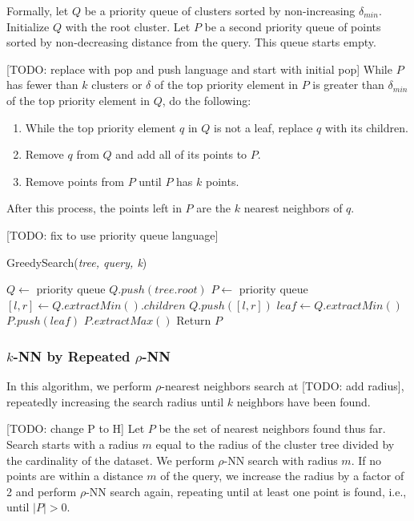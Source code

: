 Formally, let $Q$ be a priority queue of clusters sorted by non-increasing $\delta_{min}$. Initialize $Q$ with the root cluster.
Let $P$ be a second priority queue of points sorted by non-decreasing distance from the query. This queue starts empty.

[TODO: replace with pop and push language and start with initial pop]
While $P$ has fewer than $k$ clusters or $\delta$ of the top priority element in $P$ is greater 
than $\delta_{min}$ of the top priority element in $Q$, do the following:
\begin{enumerate}
\item While the top priority element $q$ in $Q$ is not a leaf, replace $q$ with its children.
\item Remove $q$ from $Q$ and add all of its points to $P$. 
\item Remove points from $P$ until $P$ has $k$ points. 
\end{enumerate}
After this process, the points left in $P$ are the $k$ nearest neighbors of $q$.

[TODO: fix to use priority queue language]

\begin{algorithm} 
\caption{GreedySearch(\emph{tree, query, k})} 
\label{alg:greedy_search} 
\begin{algorithmic}[3]
    \STATE $Q \leftarrow$ priority queue
    \STATE $Q.push(tree.root)$
    \STATE $P \leftarrow$ priority queue
            \STATE $[l, r] \leftarrow Q.extractMin().children$
            \STATE $Q.push([l, r])$
        \ENDWHILE
        \STATE $leaf \leftarrow Q.extractMin()$
        \STATE $P.push(leaf)$
            \STATE $P.extractMax()$
        \ENDWHILE
    \ENDWHILE
    \STATE Return $P$
\end{algorithmic}
\end{algorithm}


\subsubsection{$k$-NN by Repeated $\rho$-NN}
\label{subsubsec:methods:knn-search:repeated-rnn}
In this algorithm, we perform
$\rho$-nearest neighbors search at [TODO: add radius], repeatedly increasing the search radius until $k$ neighbors
have been found.

[TODO: change P to H]
Let $P$ be the set of nearest neighbors found thus far.
Search starts with a radius $m$ equal to the radius of the cluster tree divided by
the cardinality of the dataset. We perform $\rho$-NN search with radius $m$. 
If no points are within a distance $m$ of the query, we increase the radius by a factor of 
2 and perform $\rho$-NN search again, repeating until at least one point is found, i.e., 
until $|P| > 0$.


